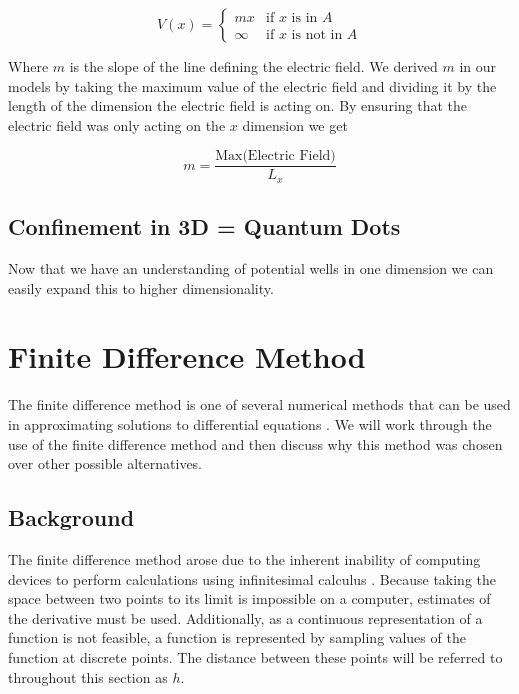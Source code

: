 \documentclass[authoryearcitations]{UoYCSproject}
\begin{document}
\begin{equation}
V(x) = \begin{cases}
          mx & \text{if $x$ is in $A$}  \\
          \infty    & \text{if $x$ is not in $A$} 
         \end{cases}
\label{vx2}
\end{equation}

Where $m$ is the slope of the line defining the electric field. We derived $m$ in our models by
taking the maximum value of the electric field and dividing it by the length of the dimension 
the electric field is acting on. By ensuring that the electric field was only acting on the $x$ dimension
we get

$$m = \frac{\text{Max(Electric Field)}}{L_x}$$

\subsection{Confinement in 3D = Quantum Dots}
Now that we have an understanding of potential wells in one dimension we can easily expand this to higher
dimensionality. 


\section{Finite Difference Method}
The finite difference method is one of several numerical methods that can be used in approximating
solutions to differential equations \cite{Hamming}. We will work through the use of the finite 
difference method and then discuss why this method was chosen over other possible alternatives. 

\subsection{Background}
The finite difference method arose due to the inherent inability of computing devices to perform
calculations using infinitesimal calculus \cite{Hamming, zhilin}. Because taking the space
between two points to its limit is impossible on a computer, estimates of the derivative must be
used. Additionally, as a continuous representation of a function is not feasible, a function is represented
by sampling values of the function at discrete points. The distance between these points will
be referred to throughout this section as $h$. 
\end{document}
